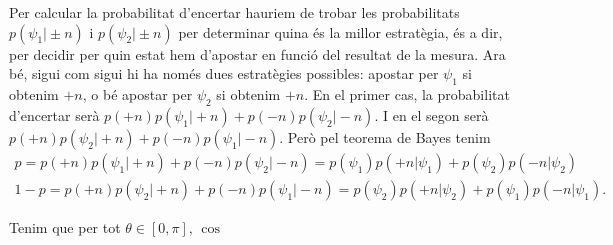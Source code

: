 \documentclass[12pt]{article}
\numberwithin{table}{section}
\numberwithin{figure}{section}
\numberwithin{equation}{section}
\begin{document}
Per calcular la probabilitat d'encertar hauriem de trobar les probabilitats \( p(\psi_1 \vert \pm n) \) i \( p(\psi_2 \vert \pm n) \) per determinar quina és la millor estratègia, és a dir, per decidir per quin estat hem d'apostar en funció del resultat de la mesura. Ara bé, sigui com sigui hi ha només dues estratègies possibles: apostar per \( \psi_1 \) si obtenim \( +n \), o bé apostar per \( \psi_2 \) si obtenim \( +n \). En el primer cas, la probabilitat d'encertar serà \( p(+n)p(\psi_1 \vert +n) + p(-n)p(\psi_2 \vert -n) \). I en el segon serà \( p(+n)p(\psi_2 \vert +n) + p(-n)p(\psi_1 \vert -n) \). Però pel teorema de Bayes tenim
\begin{gather*}
	p = p(+n)p(\psi_1 \vert +n) + p(-n)p(\psi_2 \vert -n) = p(\psi_1)p(+n \vert \psi_1) + p(\psi_2)p(-n \vert \psi_2) \\
1 - p = p(+n)p(\psi_2 \vert +n) + p(-n)p(\psi_1 \vert -n) = p(\psi_2)p(+n \vert \psi_2) + p(\psi_1)p(-n \vert \psi_1). \end{gather*}

Tenim que per tot \( \theta \in [0,\pi]  \), \( \cos{} \)
\end{document}
